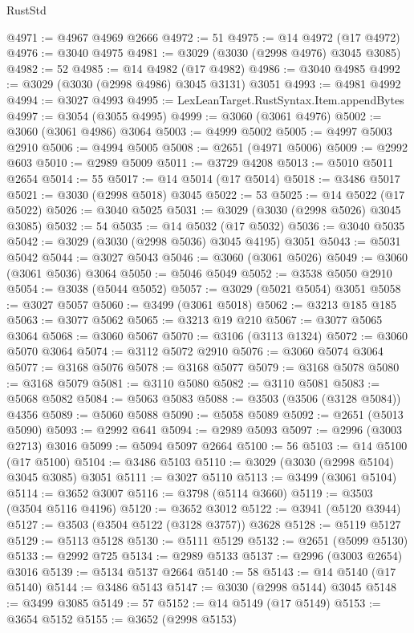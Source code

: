 \begin{lexlean}{RustStd}
\begin{coremodule}
@4971 := @4967 @4969 @2666
@4972 := 51
@4975 := @14 @4972 (@17 @4972)
@4976 := @3040 @4975
@4981 := @3029 (@3030 (@2998 @4976) @3045 @3085)
@4982 := 52
@4985 := @14 @4982 (@17 @4982)
@4986 := @3040 @4985
@4992 := @3029 (@3030 (@2998 @4986) @3045 @3131) @3051
@4993 := @4981 @4992
@4994 := @3027 @4993
@4995 := LexLeanTarget.RustSyntax.Item.appendBytes
@4997 := @3054 (@3055 @4995)
@4999 := @3060 (@3061 @4976)
@5002 := @3060 (@3061 @4986) @3064
@5003 := @4999 @5002
@5005 := @4997 @5003 @2910
@5006 := @4994 @5005
@5008 := @2651 (@4971 @5006)
@5009 := @2992 @603
@5010 := @2989 @5009
@5011 := @3729 @4208
@5013 := @5010 @5011 @2654
@5014 := 55
@5017 := @14 @5014 (@17 @5014)
@5018 := @3486 @5017
@5021 := @3030 (@2998 @5018) @3045
@5022 := 53
@5025 := @14 @5022 (@17 @5022)
@5026 := @3040 @5025
@5031 := @3029 (@3030 (@2998 @5026) @3045 @3085)
@5032 := 54
@5035 := @14 @5032 (@17 @5032)
@5036 := @3040 @5035
@5042 := @3029 (@3030 (@2998 @5036) @3045 @4195) @3051
@5043 := @5031 @5042
@5044 := @3027 @5043
@5046 := @3060 (@3061 @5026)
@5049 := @3060 (@3061 @5036) @3064
@5050 := @5046 @5049
@5052 := @3538 @5050 @2910
@5054 := @3038 (@5044 @5052)
@5057 := @3029 (@5021 @5054) @3051
@5058 := @3027 @5057
@5060 := @3499 (@3061 @5018)
@5062 := @3213 @185 @185
@5063 := @3077 @5062
@5065 := @3213 @19 @210
@5067 := @3077 @5065 @3064
@5068 := @3060 @5067
@5070 := @3106 (@3113 @1324)
@5072 := @3060 @5070 @3064
@5074 := @3112 @5072 @2910
@5076 := @3060 @5074 @3064
@5077 := @3168 @5076
@5078 := @3168 @5077
@5079 := @3168 @5078
@5080 := @3168 @5079
@5081 := @3110 @5080
@5082 := @3110 @5081
@5083 := @5068 @5082
@5084 := @5063 @5083
@5088 := @3503 (@3506 (@3128 @5084)) @4356
@5089 := @5060 @5088
@5090 := @5058 @5089
@5092 := @2651 (@5013 @5090)
@5093 := @2992 @641
@5094 := @2989 @5093
@5097 := @2996 (@3003 @2713) @3016
@5099 := @5094 @5097 @2664
@5100 := 56
@5103 := @14 @5100 (@17 @5100)
@5104 := @3486 @5103
@5110 := @3029 (@3030 (@2998 @5104) @3045 @3085) @3051
@5111 := @3027 @5110
@5113 := @3499 (@3061 @5104)
@5114 := @3652 @3007
@5116 := @3798 (@5114 @3660)
@5119 := @3503 (@3504 @5116 @4196)
@5120 := @3652 @3012
@5122 := @3941 (@5120 @3944)
@5127 := @3503 (@3504 @5122 (@3128 @3757)) @3628
@5128 := @5119 @5127
@5129 := @5113 @5128
@5130 := @5111 @5129
@5132 := @2651 (@5099 @5130)
@5133 := @2992 @725
@5134 := @2989 @5133
@5137 := @2996 (@3003 @2654) @3016
@5139 := @5134 @5137 @2664
@5140 := 58
@5143 := @14 @5140 (@17 @5140)
@5144 := @3486 @5143
@5147 := @3030 (@2998 @5144) @3045
@5148 := @3499 @3085
@5149 := 57
@5152 := @14 @5149 (@17 @5149)
@5153 := @3654 @5152
@5155 := @3652 (@2998 @5153)

\end{coremodule}
\end{lexlean}
